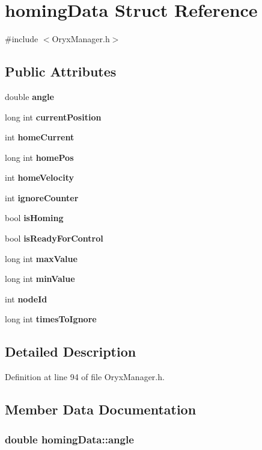 \section{homing\-Data \-Struct \-Reference}
\label{structhomingData}


{\ttfamily \#include $<$\-Oryx\-Manager.\-h$>$}

\subsection*{\-Public \-Attributes}
\begin{DoxyCompactItemize}
\item 
double {\bf angle}
\item 
long int {\bf current\-Position}
\item 
int {\bf home\-Current}
\item 
long int {\bf home\-Pos}
\item 
int {\bf home\-Velocity}
\item 
int {\bf ignore\-Counter}
\item 
bool {\bf is\-Homing}
\item 
bool {\bf is\-Ready\-For\-Control}
\item 
long int {\bf max\-Value}
\item 
long int {\bf min\-Value}
\item 
int {\bf node\-Id}
\item 
long int {\bf times\-To\-Ignore}
\end{DoxyCompactItemize}


\subsection{\-Detailed \-Description}


\-Definition at line 94 of file \-Oryx\-Manager.\-h.



\subsection{\-Member \-Data \-Documentation}
\subsubsection[{angle}]{\setlength{\rightskip}{0pt plus 5cm}double {\bf homing\-Data\-::angle}}\label{structhomingData_ab25b9224e4c529d11f42130f5363c264}


